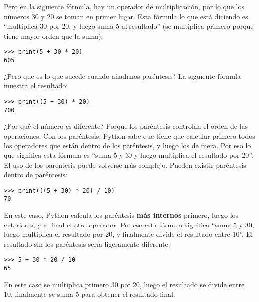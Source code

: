 \noindent
Pero en la siguiente fórmula, hay un operador de multiplicación, por lo que los números 30 y 20 se toman en primer lugar. Esta fórmula lo que está diciendo es ``multiplica 30 por 20, y luego suma 5 al resultado'' (se multiplica primero porque tiene mayor orden que la suma): 

\begin{listing}
\begin{verbatim}
>>> print(5 + 30 * 20)
605
\end{verbatim}
\end{listing}

\noindent
¿Pero qué es lo que sucede cuando añadimos paréntesis? La siguiente fórmula muestra el resultado:

\begin{listing}
\begin{verbatim}
>>> print((5 + 30) * 20)
700
\end{verbatim}
\end{listing}

\noindent
¿Por qué el número es diferente? Porque los paréntesis controlan el orden de las operaciones. Con los paréntesis, Python sabe que tiene que calcular primero todos los operadores que están dentro de los paréntesis, y luego los de fuera. Por eso lo que significa esta fórmula es ``suma 5 y 30 y luego multiplica el resultado por 20''.
El uso de los paréntesis puede volverse más complejo. Pueden existir paréntesis dentro de paréntesis:

\begin{listing}
\begin{verbatim}
>>> print(((5 + 30) * 20) / 10)
70
\end{verbatim}
\end{listing}

\noindent
En este caso, Python calcula los paréntesis \textbf{más internos} primero, luego los exteriores, y al final el otro operador. Por eso esta fórmula significa ``suma 5 y 30, luego multiplica el resultado por 20, y finalmente divide el resultado entre 10''. El resultado sin los paréntesis sería ligeramente diferente:

\begin{listing}
\begin{verbatim}
>>> 5 + 30 * 20 / 10
65
\end{verbatim}
\end{listing}

En este caso se multiplica primero 30 por 20, luego el resultado se divide entre 10, finalmente se suma 5 para obtener el resultado final.

